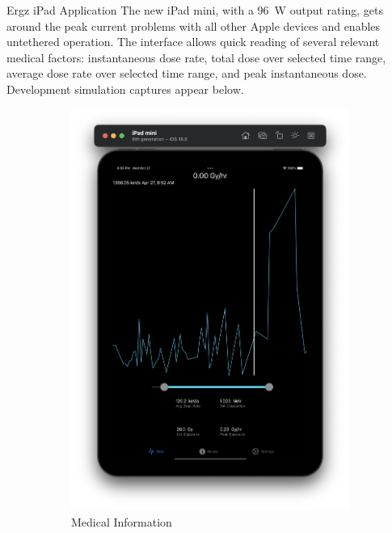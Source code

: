 \documentclass{beamer}
\begin{document}
\begin{frame}
\begin{columns}[t]
    \begin{column}{0.38\linewidth}
      \begin{block}{Ergz iPad Application}
        The new iPad mini, with a \SI{96}{W} output rating, gets around the peak current problems with all other Apple devices and enables untethered operation. The interface allows quick reading of several relevant medical factors: instantaneous dose rate, total dose over selected time range, average dose rate over selected time range, and peak instantaneous dose. Development simulation captures appear below.
        \begin{figure}
          \centering
          \begin{subfigure}{.5\textwidth}
            \centering
            \includegraphics[width=.9\linewidth]{screen1.png}
            \caption{Medical Information}
          \end{subfigure}%
          \begin{subfigure}{.5\textwidth}
            \centering

\end{subfigure}
\end{figure}
\end{block}
\end{column}
\end{columns}
\end{frame}
\end{document}
